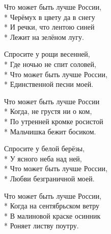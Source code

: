 \medskip

\begin{minipage}{\linewidth}
Что может быть лучше России,\\*
Черёмух в цвету да в снегу\\*
И речки, что лентою синей\\*
Лежит на зелёном лугу.\\
\end{minipage}\par\medskip\nobreak

\medskip

\begin{minipage}{\linewidth}
Спросите у рощи весенней,\\*
Где ночью не спит соловей,\\*
Что может быть лучше России,\\*
Единственной песни моей.\\
\end{minipage}\par\medskip\nobreak

\medskip

\begin{minipage}{\linewidth}
Что может быть лучше России\\*
Когда, не грустя ни о ком,\\*
По утренней кромке росистой\\*
Мальчишка бежит босиком.\\
\end{minipage}\par\medskip\nobreak

\medskip

\begin{minipage}{\linewidth}
Спросите у белой берёзы,\\*
У ясного неба над ней,\\*
Что может быть лучше России,\\*
Любви безграничной моей.\\
\end{minipage}\par\medskip\nobreak

\medskip

\begin{minipage}{\linewidth}
Что может быть лучше России,\\*
Когда на сентябрьском ветру\\*
В малиновой краске осинник\\*
Роняет листву поутру.\\
\end{minipage}\par\medskip\nobreak

